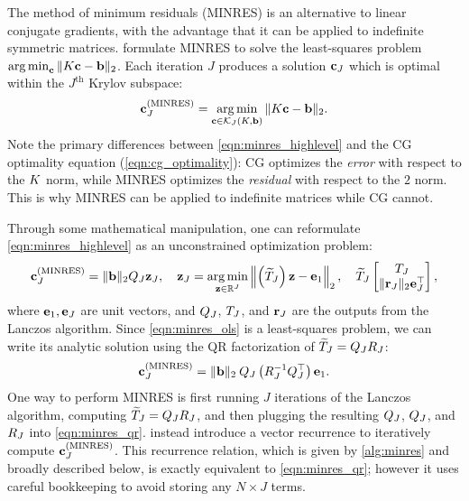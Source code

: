 The method of minimum residuals (MINRES) \cite{paige1975solution} is an alternative to linear conjugate gradients, with the advantage that it can be applied to indefinite symmetric matrices.
\citet{paige1975solution} formulate MINRES to solve the least-squares problem $\operatorname*{arg\,min}_{\mathbf{c}} \Vert K \mathbf{c} - \mathbf{b} \Vert_2$.
Each iteration $J$ produces a solution $\mathbf{c}_J$ which is optimal within the $J^\text{th}$ Krylov subspace:
%
\begin{equation}
	\mathbf{c}_J^{(\text{MINRES})} = \operatorname*{arg\,min}_{\mathbf{c} \in \mathcal{K}_J(K, \mathbf{b})} \Vert K \mathbf{c} - \mathbf{b} \Vert_2.
	\label{eqn:minres_highlevel}
\end{equation}
%
Note the primary differences between \cref{eqn:minres_highlevel} and the CG optimality equation (\cref{eqn:cg_optimality}):
CG optimizes the \emph{error} with respect to the $K$ norm, while MINRES optimizes the \emph{residual} with respect to the $2$ norm.
This is why MINRES can be applied to indefinite matrices while CG cannot.

Through some mathematical manipulation, one can reformulate \cref{eqn:minres_highlevel} as an unconstrained optimization problem:
%
\begin{align}
  \mathbf{c}_J^{(\text{MINRES})} = \Vert \mathbf{b} \Vert_2 Q_J \mathbf{z}_J,
  \quad
  \mathbf{z}_J = \operatorname*{arg\,min}_{\mathbf{z} \in \mathbb{R}^J} \left\Vert
		\left( \widetilde {T}_J \right)\mathbf{z} - \mathbf{e}_1
	\right\Vert_2,
	\quad
  \widetilde {T}_J \begin{bmatrix} T_J \\ \Vert \mathbf{r}_J \Vert_2 \mathbf{e}_J^\top  \end{bmatrix},
  \label{eqn:minres_ols}
\end{align}
%
where $\mathbf{e}_1, \mathbf{e}_J$ are unit vectors, and $Q_J$, $T_J$, and $\mathbf{r}_J$ are the outputs from the Lanczos algorithm.
Since \cref{eqn:minres_ols} is a least-squares problem, we can write its analytic solution using the QR factorization of $ \widetilde {T}_J = Q_J R_J$:
%
\begin{align}
  \mathbf{c}_J^{(\text{MINRES})} = \Vert \mathbf{b} \Vert_2 \: Q_J \left( R_J^{-1} Q_J^\top \right) \mathbf{e}_1.
	\label{eqn:minres_qr}
\end{align}
%
One way to perform MINRES is first running $J$ iterations of the Lanczos algorithm, computing $\widetilde {T}_J = Q_J R_J$, and then plugging the resulting $Q_J$, $Q_J$, and $R_J$ into \cref{eqn:minres_qr}.
\citeauthor{paige1975solution} instead introduce a vector recurrence to iteratively compute $\mathbf{c}_J^\text{(MINRES)}$.
This recurrence relation, which is given by \cref{alg:minres} and broadly described below, is exactly equivalent to \cref{eqn:minres_qr}; however it uses careful bookkeeping to avoid storing any $N \times J$ terms.

